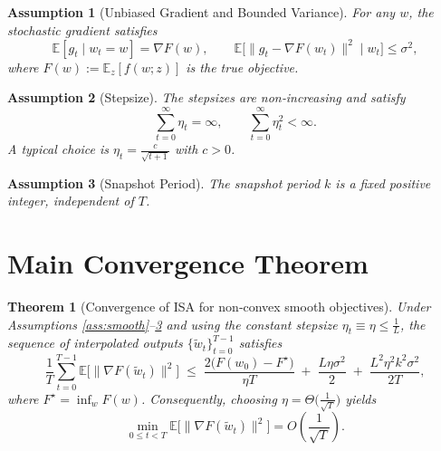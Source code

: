 \documentclass{article}
\newtheorem{theorem}{Theorem}
\newtheorem{assumption}{Assumption}
\newcommand{\EE}{\mathbb{E}}
\begin{document}
\begin{assumption}[Unbiased Gradient and Bounded Variance]
\label{ass:unbiased}
For any $w$, the stochastic gradient satisfies
\[
\EE[g_t\mid w_t=w]=\nabla F(w),\qquad 
\EE\big[\|g_t-\nabla F(w_t)\|^{2}\mid w_t\big]\le\sigma^{2},
\]
where $F(w):=\EE_{z}[f(w;z)]$ is the true objective.
\end{assumption}

\begin{assumption}[Stepsize]
\label{ass:stepsize}
The stepsizes are non‑increasing and satisfy
\[
\sum_{t=0}^{\infty}\eta_t=\infty,\qquad
\sum_{t=0}^{\infty}\eta_t^{2}<\infty .
\]
A typical choice is $\eta_t=\frac{c}{\sqrt{t+1}}$ with $c>0$.
\end{assumption}

\begin{assumption}[Snapshot Period]
\label{ass:k}
The snapshot period $k$ is a fixed positive integer, independent of $T$.
\end{assumption}

\section*{Main Convergence Theorem}
\begin{theorem}[Convergence of ISA for non‑convex smooth objectives]
\label{thm:main}
Under Assumptions \ref{ass:smooth}–\ref{ass:k} and using the constant stepsize
$\eta_t\equiv\eta\le\frac{1}{L}$, the sequence of interpolated outputs
$\{\widetilde w_t\}_{t=0}^{T-1}$ satisfies
\[
\frac{1}{T}\sum_{t=0}^{T-1}\EE\big[\|\nabla F(\widetilde w_t)\|^{2}\big]
\;\le\;
\frac{2\big(F(w_0)-F^{\star}\big)}{\eta T}
\;+\;
\frac{L\eta\sigma^{2}}{2}
\;+\;
\frac{L^{2}\eta^{2}k^{2}\sigma^{2}}{2T},
\tag{1}
\]
where $F^{\star}=\inf_{w}F(w)$.  
Consequently, choosing $\eta=\Theta\!\big(\tfrac{1}{\sqrt{T}}\big)$ yields
\[
\min_{0\le t<T}\EE\big[\|\nabla F(\widetilde w_t)\|^{2}\big]
=O\!\left(\frac{1}{\sqrt{T}}\right).
\]
\end{theorem}
\end{document}
